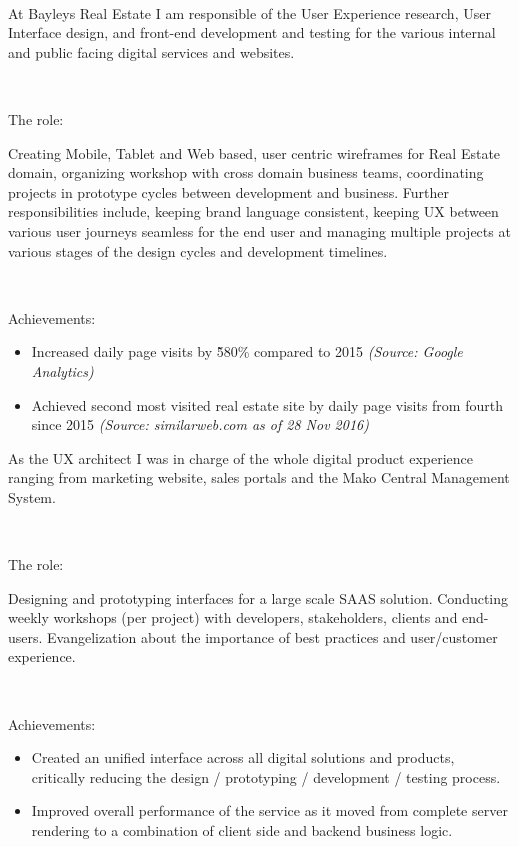 \documentclass{resume}
\begin{document}
  ~\par
{}
  At Bayleys Real Estate I am responsible of the User Experience research, User Interface design, and front-end development and testing for the various internal and public facing digital services and websites.\par
  ~\par
  {The role:}\par
  Creating Mobile, Tablet and Web based, user centric wireframes for Real Estate domain, organizing workshop with cross domain business teams, coordinating projects in prototype cycles between development and business. Further responsibilities include, keeping brand language consistent, keeping UX between various user journeys seamless for the end user and managing multiple projects at various stages of the design cycles and development timelines.\par
  ~\par
  {Achievements:}\par
  \begin{itemize}
    \item Increased daily page visits by \~580\% compared to 2015 \textit{(Source: Google Analytics)}
    \item Achieved second most visited real estate site by daily page visits from fourth since 2015 \textit{(Source: similarweb.com as of 28 Nov 2016)}
  \end{itemize}
  As the UX architect I was in charge of the whole digital product experience ranging from marketing website, sales portals and the Mako Central Management System.\par
  ~\par
  {The role:}\par
  Designing and prototyping interfaces for a large scale SAAS solution. Conducting weekly workshops (per project) with developers, stakeholders, clients and end-users. Evangelization about the importance of best practices and user/customer experience.\par
  ~\par
  {Achievements:}\par
\begin{itemize}
  \item Created an unified interface across all digital solutions and products, critically reducing the design / prototyping / development / testing process.
  \item Improved overall performance of the service as it moved from complete server rendering to a combination of client side and backend business logic.
\end{itemize}
\end{document}
